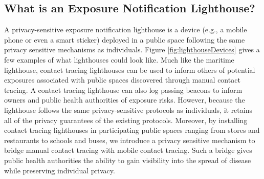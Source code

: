 \subsection{What is an Exposure Notification Lighthouse?}
A privacy-sensitive exposure notification lighthouse is a device (e.g., a mobile phone or even a smart sticker) deployed in a public space following the same privacy sensitive mechanisms as individuals. Figure \ref{fig:lighthouseDevices} gives a few examples of what lighthouses could look like.
Much like the maritime lighthouse, contact tracing lighthouses can be used to inform others of potential exposures associated with public spaces discovered through manual contact tracing. 
A contact tracing lighthouse can also log passing beacons to inform owners and public health authorities of exposure risks. However, because the lighthouse follows the same privacy-sensitive protocols as individuals, it retains all of the privacy guarantees of the existing protocols. Moreover, by installing contact tracing lighthouses in participating public spaces ranging from stores and restaurants to schools and buses, we introduce a privacy sensitive mechanism to bridge manual contact tracing with mobile contact tracing. Such a bridge gives public health authorities the ability to gain visibility into the spread of disease while preserving individual privacy.

